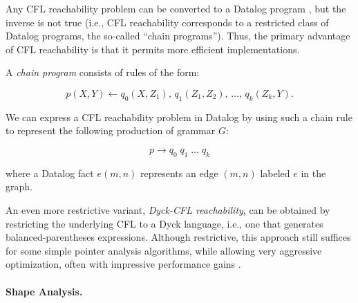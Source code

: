 Any CFL reachability problem can be converted to a Datalog program
\cite{journals/infsof/Reps98}, but the inverse is not true (i.e., CFL
reachability corresponds to a restricted class of Datalog programs,
the so-called ``chain programs''). Thus, the primary advantage of CFL
reachability is that it permits more efficient implementations.

A \emph{chain program} consists of rules of the form:

\[p(X, Y) \leftarrow q_0(X,Z_1),\, q_1(Z_1, Z_2),\, \dots,\, q_k(Z_k,
  Y). \]

We can express a CFL reachability problem in Datalog by using such a
chain rule to represent the following production of grammar \(G\):

\[p \rightarrow q_0\; q_1\; \dots\; q_k \]

where a Datalog fact \(e(m, n)\) represents an edge \((m, n)\) labeled
\(e\) in the graph.

An even more restrictive variant, \emph{Dyck-CFL reachability}, can be
obtained by restricting the underlying CFL to a Dyck language, i.e.,
one that generates balanced-parentheses expressions. Although
restrictive, this approach still suffices for some simple pointer
analysis algorithms, while allowing very aggressive optimization,
often with impressive performance gains \cite{pldi/ZhangLYS13}.





\paragraph{Shape Analysis.}

